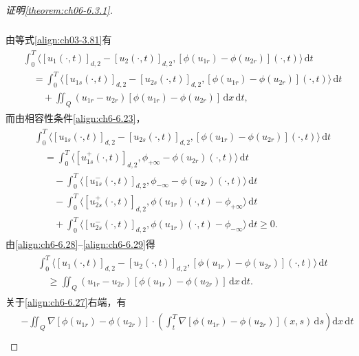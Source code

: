 \documentclass[../../main.tex]{subfiles}%
\begin{document}
\begin{proof}[证明\cref{theorem:ch06-6.3.1}]
\begin{align}
\begin{aligned}
\end{aligned}
\label{align:ch6-6.27}
\end{align}
由等式\eqref{align:ch03-3.81}有
\begin{align}
\begin{aligned}
&\int_0^T\langle[u_1(\cdot,t)]_{d,2}-[u_2(\cdot,t)]_{d,2},
[\phi(u_{1r})-\phi(u_{2r})](\cdot,t)\rangle\,\mathrm{d}t\\
&\quad= \int_0^T\langle[u_{1s}(\cdot,t)]_{d,2}-[u_{2s}(\cdot,t)]_{d,2},
[\phi(u_{1r})-\phi(u_{2r})](\cdot,t)\rangle\,\mathrm{d}t\\
&\qquad+\iint_Q(u_{1r}-u_{2r})[\phi(u_{1r})-\phi(u_{2r})]\,\mathrm{d}x\,\mathrm{d}t,
\end{aligned}
\label{align:ch6-6.28}
\end{align}
而由相容性条件\eqref{align:ch6-6.23}，
\begin{align}
\begin{aligned}
&\int_0^T\langle[u_{1s}(\cdot,t)]_{d,2}-[u_{2s}(\cdot,t)]_{d,2},
[\phi(u_{1r})-\phi(u_{2r})](\cdot,t)\rangle\,\mathrm{d}t\\
&\quad= \int_0^T\langle[u^+_{1s}(\cdot,t)]_{d,2},\phi_{+\infty}-\phi(u_{2r})(\cdot,t)\rangle\,\mathrm{d}t\\
&\qquad-\int_0^T\langle[u^-_{1s}(\cdot,t)]_{d,2},\phi_{-\infty}-\phi(u_{2r})(\cdot,t)\rangle\,\mathrm{d}t\\
&\qquad-\int_0^T\langle[u^+_{2s}(\cdot,t)]_{d,2},\phi(u_{1r})(\cdot,t)-\phi_{+\infty}\rangle\,\mathrm{d}t\\
&\qquad+\int_0^T\langle[u^-_{2s}(\cdot,t)]_{d,2},\phi(u_{1r})(\cdot,t)-\phi_{-\infty}\rangle\,\mathrm{d}t
\geqslant0.
\end{aligned}
\label{align:ch6-6.29}
\end{align}
由\eqref{align:ch6-6.28}--\eqref{align:ch6-6.29}得
\begin{align}
\begin{aligned}
&\int_0^T\langle[u_1(\cdot,t)]_{d,2}-[u_2(\cdot,t)]_{d,2},
[\phi(u_{1r})-\phi(u_{2r})](\cdot,t)\rangle\,\mathrm{d}t\\
&\quad\geqslant\iint_Q(u_{1r}-u_{2r})[\phi(u_{1r})-\phi(u_{2r})]\,\mathrm{d}x\,\mathrm{d}t.
\end{aligned}
\label{align:ch6-6.30}
\end{align}
关于\eqref{align:ch6-6.27}右端，有
\begin{align}
\begin{aligned}
&-\iint_Q\nabla[\phi(u_{1r})-\phi(u_{2r})]\cdot
\left(\int_t^T\nabla[\phi(u_{1r})-\phi(u_{2r})](x,s)\,\mathrm{d}s\right)\mathrm{d}x\,\mathrm{d}t\\

\end{aligned}
\end{align}
\end{proof}
\end{document}
